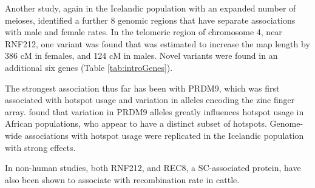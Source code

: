 Another study, again in the Icelandic population with an expanded number of meioses, identified a further 8 genomic regions that have separate associations with male and female rates\cite{Kong2014}.
In the telomeric region of chromosome 4, near RNF212, one variant was found that was estimated to increase the map length by 386 cM in females, and 124 cM in males.
Novel variants were found in an additional six genes (Table \ref{tab:introGenes}).

The strongest association thus far has been with PRDM9, which was first associated with hotspot usage and variation in alleles encoding the zinc finger array\cite{Baudat2010,Berg2010}.
\citet{Berg2011} found that variation in PRDM9 alleles greatly influences hotspot usage in African populations, who appear to have a distinct subset of hotspots\cite{Hinch2011}.
Genome-wide associations with hotspot usage were replicated in the Icelandic population with strong effects\cite{Kong2010}.

In non-human studies, both RNF212, and REC8, a SC-associated protein, have also been shown to associate with recombination rate in cattle\cite{Sandor2012}.
%

